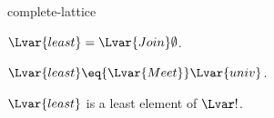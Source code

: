 \documentclass{stex}
\begin{document}
\begin{smodule}{complete-lattice}
\begin{definition*}[forthel,id=CompleteLatticeLeastDef,printid]
  ${\Lvar{least}}={\Lvar{Join}}\emptyset$.
\end{definition*}

\begin{proposition*}[forthel,id=GreatestIsMeetOfUniverseThm,printid]
  ${\Lvar{least}}\eq{\Lvar{Meet}}\Lvar{univ}$.
\end{proposition*}

\begin{proposition*}[forthel,id=LeastIsLeastElementThm,printid]
  ${\Lvar{least}}$ is a least element of $\Lvar!$.
\end{proposition*}
\end{smodule}
\end{document}
